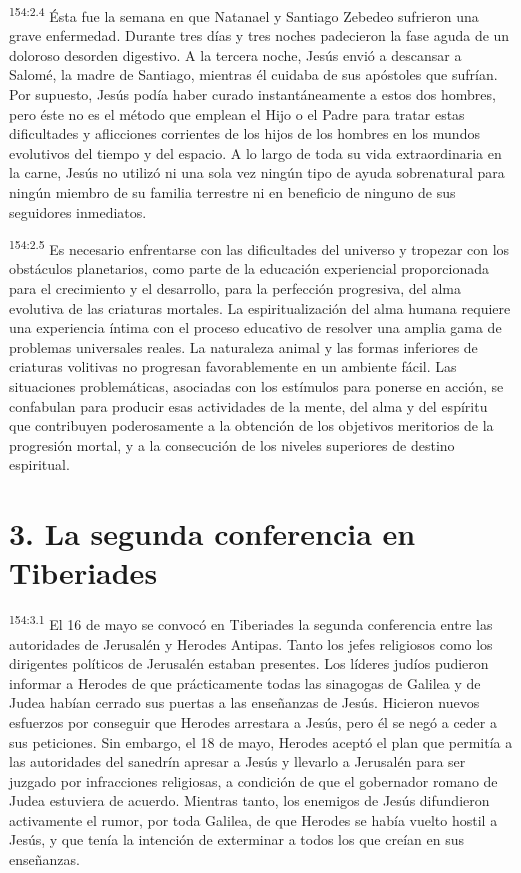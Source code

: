 \par
\textsuperscript{154:2.4} Ésta fue la semana en que Natanael y Santiago Zebedeo sufrieron una grave enfermedad. Durante tres días y tres noches padecieron la fase aguda de un doloroso desorden digestivo. A la tercera noche, Jesús envió a descansar a Salomé, la madre de Santiago, mientras él cuidaba de sus apóstoles que sufrían. Por supuesto, Jesús podía haber curado instantáneamente a estos dos hombres, pero éste no es el método que emplean el Hijo o el Padre para tratar estas dificultades y aflicciones corrientes de los hijos de los hombres en los mundos evolutivos del tiempo y del espacio. A lo largo de toda su vida extraordinaria en la carne, Jesús no utilizó ni una sola vez ningún tipo de ayuda sobrenatural para ningún miembro de su familia terrestre ni en beneficio de ninguno de sus seguidores inmediatos.

\par
\textsuperscript{154:2.5} Es necesario enfrentarse con las dificultades del universo y tropezar con los obstáculos planetarios, como parte de la educación experiencial proporcionada para el crecimiento y el desarrollo, para la perfección progresiva, del alma evolutiva de las criaturas mortales. La espiritualización del alma humana requiere una experiencia íntima con el proceso educativo de resolver una amplia gama de problemas universales reales. La naturaleza animal y las formas inferiores de criaturas volitivas no progresan favorablemente en un ambiente fácil. Las situaciones problemáticas, asociadas con los estímulos para ponerse en acción, se confabulan para producir esas actividades de la mente, del alma y del espíritu que contribuyen poderosamente a la obtención de los objetivos meritorios de la progresión mortal, y a la consecución de los niveles superiores de destino espiritual.

\section*{3. La segunda conferencia en Tiberiades}
\par
\textsuperscript{154:3.1} El 16 de mayo se convocó en Tiberiades la segunda conferencia entre las autoridades de Jerusalén y Herodes Antipas. Tanto los jefes religiosos como los dirigentes políticos de Jerusalén estaban presentes. Los líderes judíos pudieron informar a Herodes de que prácticamente todas las sinagogas de Galilea y de Judea habían cerrado sus puertas a las enseñanzas de Jesús. Hicieron nuevos esfuerzos por conseguir que Herodes arrestara a Jesús, pero él se negó a ceder a sus peticiones. Sin embargo, el 18 de mayo, Herodes aceptó el plan que permitía a las autoridades del sanedrín apresar a Jesús y llevarlo a Jerusalén para ser juzgado por infracciones religiosas, a condición de que el gobernador romano de Judea estuviera de acuerdo. Mientras tanto, los enemigos de Jesús difundieron activamente el rumor, por toda Galilea, de que Herodes se había vuelto hostil a Jesús, y que tenía la intención de exterminar a todos los que creían en sus enseñanzas.

